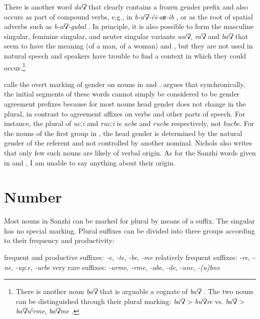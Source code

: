 There is another word \textit{daˁʡ}  that clearly contains a frozen gender prefix and also occurs as part of compound verbs, e.g., in \textit{b-aˁʡ-či-aʁ-ib} , or as the root of spatial adverbs such as \textit{b-aˁʡ-gubal} . In principle, it is also possible to form the masculine singular, feminine singular, and neuter singular variants \textit{waˁʡ}, \textit{raˁʡ} and \textit{baˁʡ} that seem to have the meaning (of a man, of a woman) and , but they are not used in natural speech and speakers have trouble to find a context in which they could occur.\footnote{There is another noun \textit{baˁʡ}  that is arguable a cognate of \textit{baˁʡ} . The two nouns can be distinguished through their plural marking: \textit{baˁʡ} > \textit{buˁʡre}  vs. \textit{baˁʡ} > \textit{baˁʡuˁrme}, \textit{baˁʡme} .}

\citet{Nichols2007} calls the overt marking of gender on nouns in  and  . \citet{Nichols2007} argues that synchronically, the initial segments of these words cannot simply be considered to be gender agreement prefixes because for most nouns head gender does not change in the plural, in contrast to agreement affixes on verbs and other parts of speech. For instance, the plural of \textit{ucːi}  and \textit{rucːi}  is \textit{ucbe} and \textit{rucbe} respectively, not \textit{bucbe}. For the nouns of the first group in , the head gender is determined by the natural gender of the referent and not controlled by another nominal. Nichols also writes that only few such nouns are likely of verbal origin. As for the Sanzhi words given in  and , I am unable to say anything about their origin.



\section{Number}
\label{sec:nounnumber}

Most nouns in Sanzhi can be marked for plural by means of a suffix. The singular has no special marking. Plural suffixes can be divided into three groups according to their frequency and productivity:
%
\begin{exe}
	\ex	\label{ex:pluralsuffixes}
	\begin{xlist}
		\ex	frequent and productive suffixes: 	\tab	\textit{-e}, \textit{-te}, \textit{-be}, \textit{-me} 
		\ex	relatively frequent suffixes: 		\tab	\textit{-re}, \textit{-ne}, \textit{-upːe}, \textit{-urbe} 
		\ex	very rare suffixes: 				\tab	\textit{-urme}, \textit{-rme}, \textit{-ube}, \textit{-de}, \textit{-une}, \textit{-(u)bne}
	\end{xlist}
\end{exe}

